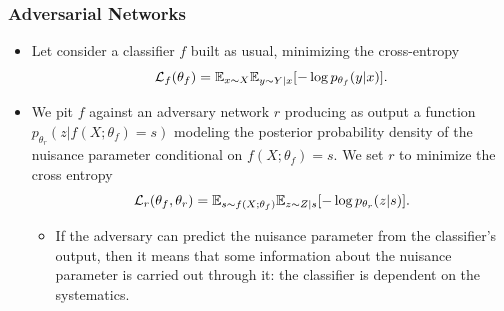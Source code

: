 \documentclass{beamer}
\begin{document}

\begin{frame}
    \frametitle{Adversarial Networks}

    \begin{itemize}
        \item Let consider {\color{blue} a classifier $f$} built as usual, minimizing the cross-entropy
            $${\cal L}_f(\theta_f) = \mathbb{E}_{x \sim X} \mathbb{E}_{y \sim Y|x} [- \log p_{\theta_f}(y|x)].$$

        \item We pit $f$ against {\color{red} an adversary network $r$} producing
        as output a function $p_{\theta_r}(z|f(X;\theta_f)=s)$ modeling the posterior
        probability density of the nuisance parameter conditional on $f(X;\theta_f)=s$.
        We set $r$ to minimize the cross entropy
            $${\cal L}_r(\theta_f, \theta_r) = \mathbb{E}_{s \sim f(X;\theta_f)} \mathbb{E}_{z \sim Z|s}[- \log p_{\theta_r}(z|s)].$$

        \begin{itemize}
            \item If the adversary can predict the nuisance parameter from the classifier's output, then it means that some
            information about the nuisance parameter is carried out through it: the classifier is dependent on the systematics.
        \end{itemize}

    \end{itemize}
\end{frame}
\end{document}

